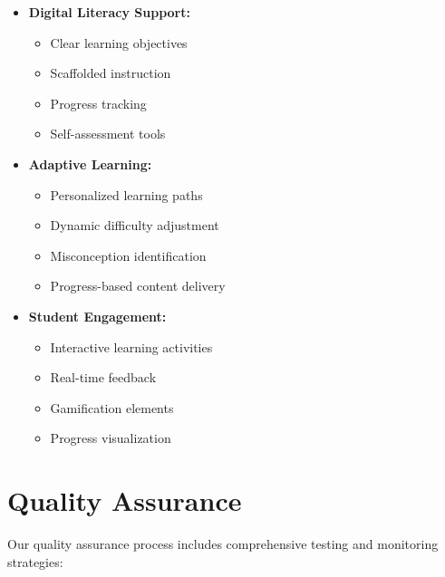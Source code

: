 \begin{itemize}
  \item \textbf{Digital Literacy Support:}
    \begin{itemize}
      \item Clear learning objectives
      \item Scaffolded instruction
      \item Progress tracking
      \item Self-assessment tools
    \end{itemize}
  
  \item \textbf{Adaptive Learning:}
    \begin{itemize}
      \item Personalized learning paths
      \item Dynamic difficulty adjustment
      \item Misconception identification
      \item Progress-based content delivery
    \end{itemize}
  
  \item \textbf{Student Engagement:}
    \begin{itemize}
      \item Interactive learning activities
      \item Real-time feedback
      \item Gamification elements
      \item Progress visualization
    \end{itemize}
\end{itemize}


\section{Quality Assurance}
\label{sec:qa}

Our quality assurance process includes comprehensive testing and monitoring strategies:

